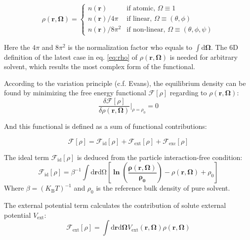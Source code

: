 \begin{equation}
\rho(\mathbf{r},\mathbf{\Omega})=\left\{ \begin{array}{ll}
n(\mathbf{r}) & \mbox{if atomic, }\Omega\equiv1\\
n(\mathbf{r})/4\pi & \mbox{if linear, }\Omega\equiv(\theta,\phi)\\
n(\mathbf{r})/8\pi^{2} & \mbox{if non-linear, }\Omega\equiv(\theta,\phi,\psi)
\end{array}\right.\label{eq:rho}
\end{equation}


Here the $4\pi$ and $8\pi^{2}$ is the normalization factor who equals
to $\int\mathrm{d}\mathbf{\Omega}$. The 6D definition of the latest
case in eq. \ref{eq:rho} of $\rho(\mathbf{r},\mathbf{\Omega})$ is
needed for arbitrary solvent, which results the most complex form
of the functional. 

According to the variation principle (c.f. Evans), the equilibrium
density can be found by minimizing the free energy functional $\mathcal{F}[\rho]$
regarding to $\rho(\mathbf{r},\mathbf{\Omega})$: 
\begin{equation}
\frac{\delta\mathcal{F}[\rho]}{\delta\rho(\mathbf{r},\mathbf{\Omega})}|_{\rho=\rho_{0}}=0
\end{equation}


And this functional is defined as a sum of functional contributions: 

\begin{equation}
\mathcal{F}[\rho]=\mathcal{F}_{\mathrm{id}}[\rho]+\mathcal{F}_{\mathrm{ext}}[\rho]+\mathcal{F}_{\mathrm{exc}}[\rho]
\end{equation}


The ideal term $\mathcal{F}_{\mathrm{id}}[\rho]$ is deduced from
the particle interaction-free condition: 
\begin{equation}
\mathcal{F}_{\mathrm{id}}[\rho]=\beta^{-1}\int\mathrm{d}\mathbf{r}\mathrm{d\Omega}\left[\mathbf{\mathbf{\ln\left(\frac{\rho(\mathbf{r},\mathbf{\mathbf{\mathbf{\mathbf{\Omega}}}})}{\rho_{0}}\right)}}-\rho(\mathbf{r},\mathbf{\mathbf{\mathbf{\Omega}}})+\rho_{0}\right]
\end{equation}
Where $\beta=\left(K_{\mathrm{B}}T\right)^{-1}$ and $\rho_{0}$ is
the reference bulk density of pure solvent. 

The external potential term calculates the contribution of solute
external potential $V_{\mathrm{ext}}$: 
\begin{equation}
\mathcal{F}_{\mathrm{ext}}[\rho]=\int\mathrm{d}\mathbf{r}\mathrm{d}\mathbf{\mathbf{\Omega}}V_{\mathrm{ext}}(\mathbf{r},\mathbf{\mathbf{\mathbf{\mathbf{\Omega}}}})\rho(\mathbf{r},\mathbf{\mathbf{\mathbf{\mathbf{\Omega}}}})
\end{equation}


